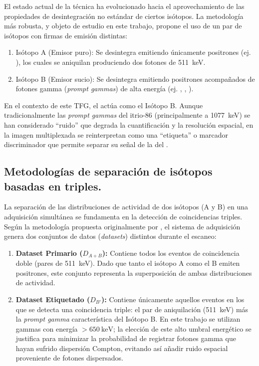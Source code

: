 El estado actual de la técnica ha evolucionado hacia el aprovechamiento de las propiedades de
desintegración no estándar de ciertos isótopos. La metodología más robusta, y objeto de estudio
en este trabajo, propone el uso de un par de isótopos con firmas de emisión distintas:

\begin{enumerate}
      \item Isótopo A (Emisor puro): Se desintegra emitiendo únicamente positrones (ej. \fdiezocho), los cuales se aniquilan produciendo dos fotones de \SI{511}{\keV}.
      \item Isótopo B (Emisor sucio): Se desintegra emitiendo positrones acompañados de fotones gamma (\textit{prompt gammas}) de alta energía (ej. \yochoseis, , ).
\end{enumerate}

En el contexto de este TFG, el \yochoseis actúa como el Isótopo B. Aunque tradicionalmente las \textit{prompt gammas} del itrio-86 (principalmente a \SI{1077}{\keV}) se han considerado \enquote{ruido} que degrada la cuantificación y la resolución espacial, en la imagen multiplexada se reinterpretan como una \enquote{etiqueta} o marcador discriminador que permite separar su señal de la del \fdiezocho \parencite{Pratt2023}.

\subsection{Metodologías de separación de isótopos basadas en triples.}

La separación de las distribuciones de actividad de dos isótopos (A y B) en una adquisición simultánea se fundamenta en la detección de coincidencias triples. Según la metodología propuesta originalmente por \citeauthor{Andreyev2011}, el sistema de adquisición genera dos conjuntos de datos (\textit{datasets}) distintos durante el escaneo:

\begin{enumerate}
      \item \textbf{Dataset Primario ($D_{A+B}$):} Contiene todos los eventos de coincidencia doble (pares de \SI{511}{\keV}). Dado que tanto el isótopo A como el B emiten positrones, este conjunto representa la superposición de ambas distribuciones de actividad.
      \item \textbf{Dataset Etiquetado ($D_{B'}$):} Contiene únicamente aquellos eventos en los que se detecta una coincidencia triple: el par de aniquilación (\SI{511}{\keV}) más la \textit{prompt gamma} característica del Isótopo B. En este trabajo se utilizan gammas con energía $> \SI{650}{\keV}$; la elección de este alto umbral energético se justifica para minimizar la probabilidad de registrar fotones gamma que hayan sufrido dispersión Compton, evitando así añadir ruido espacial proveniente de fotones dispersados.
\end{enumerate}

